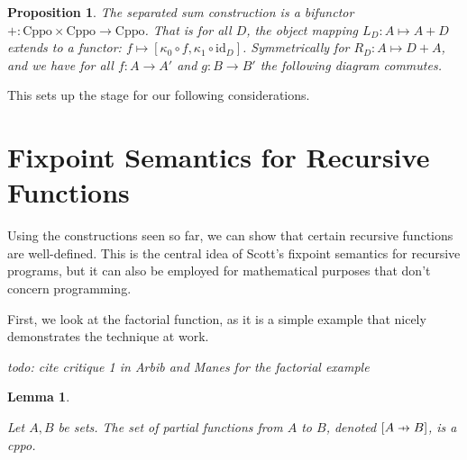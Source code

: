 \documentclass[a4paper]{article}
\newcommand{\arr}{\rightarrow}
\newcommand{\todo}[1]{\smallskip \noindent \emph{todo: #1} \smallskip}
\newcommand{\pfun}{\mathrel{\ooalign{\hfil$\mapstochar\mkern5mu$\hfil\cr$\to$\cr}}}
\newcommand{\Cppo}{\text{Cppo}}
\newtheorem{proposition}[definition]{Proposition}
\newtheorem{lemma}[definition]{Lemma}
\begin{document}
\begin{proposition}

The separated sum construction is a bifunctor $+ : \Cppo \times
\Cppo \arr \Cppo$. That is for all $D$, the
object mapping $L_D : A \mapsto A + D$ extends to a functor: $f \mapsto
[\kappa_0 \circ f, \kappa_1 \circ \text{id}_D]$.  Symmetrically
for $R_D : A \mapsto D + A$, and we have for all $f
: A \arr A'$ and $g : B \arr B'$ the following diagram commutes.
\begin{center}
\end{center}

\end{proposition}

This sets up the stage for our following considerations.

\section{Fixpoint Semantics for Recursive Functions}
\label{secFixpointSemantics}

Using the constructions seen so far, we can show that certain recursive
functions are well-defined. This is the central idea of Scott's fixpoint
semantics for recursive programs, but it can also be employed for mathematical
purposes that don't concern programming.

First, we look at the factorial function, as it is a simple example that nicely
demonstrates the technique at work.

\todo{cite critique 1 in Arbib and Manes for the factorial example}

\begin{lemma} \label{lemPartialFunctionSpaceCppo}

Let $A, B$ be sets. The set of partial functions from $A$ to $B$, denoted
$[A \pfun B]$, is a cppo.

\end{lemma}
\end{document}
